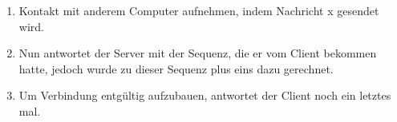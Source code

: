 \documentclass[11pt]{article}
\begin{document}
    \begin{enumerate}


        \item Kontakt mit anderem Computer aufnehmen, indem Nachricht x gesendet wird.\\

        \item Nun antwortet der Server mit der Sequenz, die er vom Client bekommen hatte,
        jedoch wurde zu dieser Sequenz plus eins dazu gerechnet.\\

        \item Um Verbindung entgültig aufzubauen, antwortet der Client noch ein letztes mal.\\

    \end{enumerate}
\end{document}
